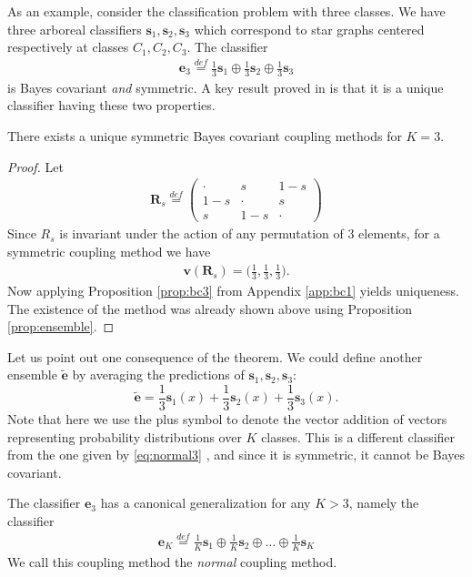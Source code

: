 As an example, consider the classification problem with three classes. We have three arboreal classifiers $\boldsymbol{s}_1, \boldsymbol{s}_2, \boldsymbol{s}_3$ which correspond to star graphs centered respectively at classes $C_1, C_2, C_3$. The classifier 
\begin{align}
\boldsymbol{e}_3 \stackrel{def}{=} \frac13 \boldsymbol{s}_1 \oplus \frac13 \boldsymbol{s}_2 \oplus \frac 13 \boldsymbol{s}_3  \label{eq:normal3}
\end{align}
is Bayes covariant \emph{and} symmetric. A key result proved in \cite{vsuch2016bayes} is that it is a unique  classifier having these two properties.

\begin{thm} \label{thm:K3}
	There exists a unique symmetric Bayes covariant coupling methods for $K=3$.
\end{thm}

\begin{proof}
Let 
\begin{align}
	\boldsymbol{R}_s \stackrel{def}{=} \begin{pmatrix} \cdot & s & 1 -s \\  1-s & \cdot & s \\ s & 1-s & \cdot \end{pmatrix}
\end{align}
Since $R_s$ is invariant under the action of any permutation of 3 elements, 
for a symmetric coupling method we have 
\begin{align}
	\boldsymbol{v} (\boldsymbol{R}_s) = \biggl(\frac 13, \frac 13, \frac 13 \biggr).
\end{align}
Now applying  Proposition \ref{prop:bc3} from Appendix \ref{app:bc1} yields uniqueness. The existence of the method was already shown above using Proposition \ref{prop:ensemble}.
\end{proof}


Let us point out one consequence of the theorem. We could define another ensemble $\tilde{\boldsymbol{e}}$ by averaging the predictions of $\boldsymbol{s}_1, \boldsymbol{s}_2, \boldsymbol{s}_3$:
\[
\tilde{\boldsymbol{e}} = \frac13 \boldsymbol{s}_1(x) + \frac13 \boldsymbol{s}_2(x) + \frac 13 \boldsymbol{s}_3(x).
\]
Note that here we use the plus symbol to denote the vector addition of vectors representing  probability distributions over $K$ classes. This is a different classifier from the one given by  \eqref{eq:normal3} , and since it is symmetric, it cannot be Bayes covariant.

The classifier $\boldsymbol{e}_3$ has a canonical generalization for any $K>3$, namely the classifier
\begin{align}
\boldsymbol{e}_K \stackrel{def}{=} \frac1K \boldsymbol{s}_1 \oplus \frac1K \boldsymbol{s}_2 \oplus \ldots \oplus \frac 1K \boldsymbol{s}_K  \label{eq:bc1}
\end{align}
We call this coupling method the \emph{normal} coupling method.


